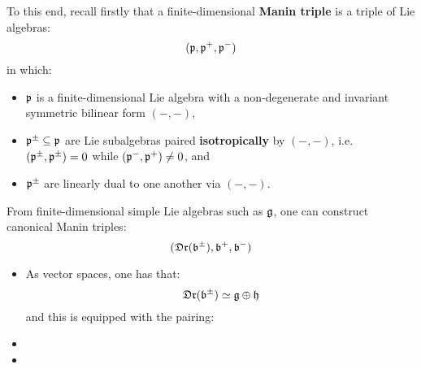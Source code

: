         To this end, recall firstly that a finite-dimensional \textbf{Manin triple} is a triple of Lie algebras:
            $$(\mathfrak{p}, \mathfrak{p}^+, \mathfrak{p}^-)$$
        in which:
        \begin{itemize}
            \item $\mathfrak{p}$ is a finite-dimensional Lie algebra with a non-degenerate and invariant symmetric bilinear form $(-, -)$,
            \item $\mathfrak{p}^{\pm} \subseteq \mathfrak{p}$ are Lie subalgebras paired \textbf{isotropically} by $(-, -)$, i.e. $(\mathfrak{p}^{\pm}, \mathfrak{p}^{\pm}) = 0$ while $(\mathfrak{p}^-, \mathfrak{p}^+) \not = 0$, and
            \item $\mathfrak{p}^{\pm}$ are linearly dual to one another via $(-, -)$.
        \end{itemize}
        From finite-dimensional simple Lie algebras such as $\mathfrak{g}$, one can construct canonical Manin triples:
            $$(\mathfrak{Dr}(\mathfrak{b}^{\pm}), \mathfrak{b}^+, \mathfrak{b}^-)$$
        \begin{itemize}
            \item As vector spaces, one has that:
                $$\mathfrak{Dr}(\mathfrak{b}^{\pm}) \simeq \mathfrak{g} \oplus \mathfrak{h}$$
            and this is equipped with the pairing:
            \item 
            \item 
        \end{itemize}

